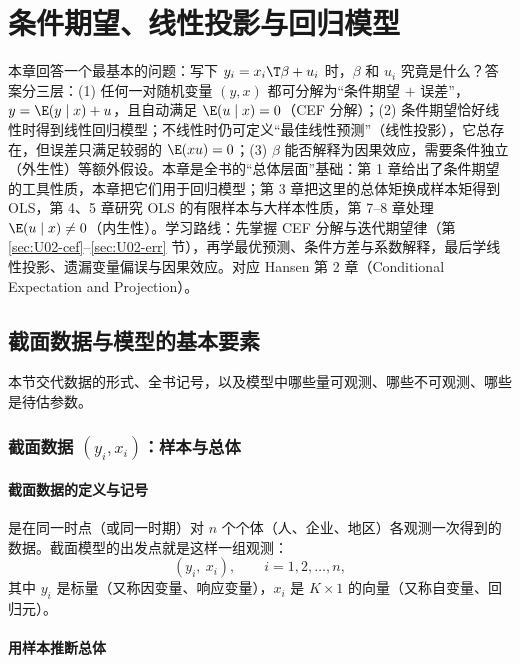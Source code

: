 \chapter{条件期望、线性投影与回归模型}
\label{ch:U02-cef}

本章回答一个最基本的问题：写下 $y_i=x_i\T\beta+u_i$ 时，$\beta$ 和 $u_i$ 究竟是什么？答案分三层：(1) 任何一对随机变量 $(y,x)$ 都可分解为“条件期望 $+$ 误差”，$y=\E(y\mid x)+u$，且自动满足 $\E(u\mid x)=0$（CEF 分解）；(2) 条件期望恰好线性时得到线性回归模型；不线性时仍可定义“最佳线性预测”（线性投影），它总存在，但误差只满足较弱的 $\E(xu)=0$；(3) $\beta$ 能否解释为因果效应，需要条件独立（外生性）等额外假设。本章是全书的“总体层面”基础：第 1 章给出了条件期望的工具性质，本章把它们用于回归模型；第 3 章把这里的总体矩换成样本矩得到 OLS，第 4、5 章研究 OLS 的有限样本与大样本性质，第 7--8 章处理 $\E(u\mid x)\neq0$（内生性）。学习路线：先掌握 CEF 分解与迭代期望律（第 \ref{sec:U02-cef}--\ref{sec:U02-err} 节），再学最优预测、条件方差与系数解释，最后学线性投影、遗漏变量偏误与因果效应。对应 Hansen 第 2 章（Conditional Expectation and Projection）。

\section{截面数据与模型的基本要素}\label{sec:U02-basics}

本节交代数据的形式、全书记号，以及模型中哪些量可观测、哪些不可观测、哪些是待估参数。

\subsection{截面数据 \texorpdfstring{$(y_i,x_i)$}{(y\_i, x\_i)}：样本与总体}

\subsubsection{截面数据的定义与记号}

是在同一时点（或同一时期）对 $n$ 个个体（人、企业、地区）各观测一次得到的数据。截面模型的出发点就是这样一组观测：
\[
(y_i,\ x_i),\qquad i=1,2,\dots,n,
\]
其中 $y_i$ 是标量（又称因变量、响应变量），$x_i$ 是 $K\times1$ 的向量（又称自变量、回归元）。

\subsubsection{用样本推断总体}

